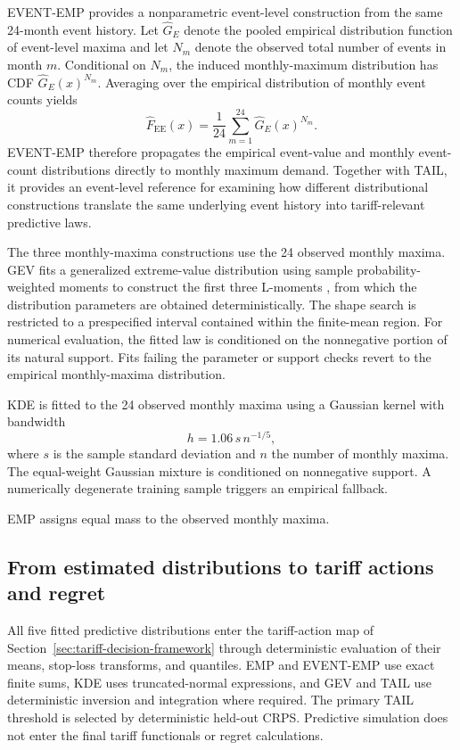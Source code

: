 \documentclass[suppldata]{interact}
\begin{document}
EVENT-EMP provides a nonparametric event-level construction from the
same 24-month event history. Let $\widehat G_E$ denote the pooled
empirical distribution function of event-level maxima and let $N_m$
denote the observed total number of events in month $m$. Conditional on
$N_m$, the induced monthly-maximum distribution has CDF
$\widehat G_E(x)^{N_m}$. Averaging over the empirical distribution of
monthly event counts yields
\[
\widehat F_{\mathrm{EE}}(x)
=
\frac{1}{24}
\sum_{m=1}^{24}
\widehat G_E(x)^{N_m}.
\]
EVENT-EMP therefore propagates the empirical event-value and monthly
event-count distributions directly to monthly maximum demand. Together
with TAIL, it provides an event-level reference for examining how
different distributional constructions translate the same underlying
event history into tariff-relevant predictive laws.

The three monthly-maxima constructions use the 24 observed monthly
maxima. GEV fits a generalized extreme-value distribution
\citep{Coles2001} using sample
probability-weighted moments to construct the first three L-moments
\citep{Hosking1990}, from which the distribution parameters are
obtained deterministically. The shape search is restricted to a
prespecified interval contained within the finite-mean region. For
numerical evaluation, the fitted law is conditioned on the
nonnegative portion of its natural support. Fits failing the parameter or
support checks revert to the empirical monthly-maxima distribution.

KDE is fitted to the 24 observed monthly maxima using a Gaussian kernel with bandwidth
\[
h=1.06\,s\,n^{-1/5},
\]
where $s$ is the sample standard deviation and $n$ the number of
monthly maxima. The equal-weight Gaussian mixture is conditioned on
nonnegative support. A numerically degenerate training sample triggers
an empirical fallback.

EMP assigns equal mass to the observed monthly maxima.

\subsection{From estimated distributions to tariff actions and regret}
\label{sec:estimated-actions-regret}

All five fitted predictive distributions enter the tariff-action map
of Section~\ref{sec:tariff-decision-framework} through deterministic
evaluation of their means, stop-loss transforms, and quantiles. EMP and
EVENT-EMP use exact finite sums, KDE uses truncated-normal expressions,
and GEV and TAIL use deterministic inversion and integration where
required. The primary TAIL threshold is selected by deterministic held-out
CRPS. Predictive simulation does not enter the final tariff functionals
or regret calculations.
\end{document}
